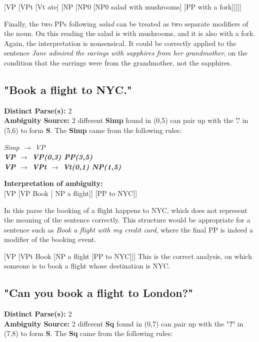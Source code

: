 \documentclass{article}
\begin{document}
{[}VP {[}VPt {[}Vt ate{]} {[}NP {[}NP0 {[}NP0 salad with mushrooms{]} {[}PP with a fork{]}{]}{]}{]}{]}

Finally, the two PPs following \emph{salad} can be treated as two separate modifiers of the noun. On this reading the salad is with mushrooms, and it is also with a fork. Again, the interpretation is nonsensical. It could be correctly applied to the sentence \emph{Jane admired the earings with sapphires from her grandmother}, on the condition that the earrings were from the grandmother, not the sapphires.

\subsection{"Book a flight to NYC."}

\textbf{Distinct Parse(s):} 2\\

\textbf{Ambiguity Source:} 2 different \textbf{Simp} found in (0,5) can pair up with the \textbf{'.'} in (5,6) to form \textbf{S}. The \textbf{Simp} came from the following rules:

\begin{center}
	\emph{Simp $\rightarrow$ VP}\\
	\textbf{\emph{VP $\rightarrow$ VP(0,3) PP(3,5)}\\
	\emph{VP $\rightarrow$ VPt $\rightarrow$ Vt(0,1) NP(1,5)}}
\end{center}

\textbf{Interpretation of ambiguity:}\\
{[}VP {[}VP Book {[} NP a flight{]}{]} {[}PP to NYC{]}{]}

In this parse the booking of a flight happens to NYC, which does not represent the meaning of the sentence correctly. This structure would be appropriate for a sentence such as \emph{Book a flight with my credit card}, where the final PP is indeed a modifier of the booking event.

{[}VP {[}VPt Book {[}NP a flight {[}PP to NYC{]}{]}{]}
This is the correct analysis, on which someone is to book a flight whose destination is NYC.


\subsection{"Can you book a flight to London?"}

\textbf{Distinct Parse(s):} 2\\

\textbf{Ambiguity Source:} 2 different \textbf{Sq} found in (0,7) can pair up with the \textbf{'?'} in (7,8) to form \textbf{S}. The \textbf{Sq} came from the following rules:
\end{document}
